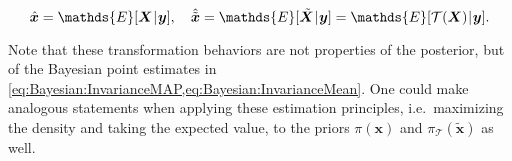 \begin{equation} \label{eq:Bayesian:InvarianceMean}
  \hat{\bm{x}} = \mathds{E}[\bm{X} \cond \bm{y}], \quad
  \hat{\tilde{\bm{x}}} = \mathds{E}[\tilde{\bm{X}} \cond \bm{y}] = \mathds{E}[\mathcal{T}(\bm{X}) \cond \bm{y}].
\end{equation}
\par %
Note that these transformation behaviors are not properties of the posterior, but of the Bayesian point estimates in \cref{eq:Bayesian:InvarianceMAP,eq:Bayesian:InvarianceMean}.
One could make analogous statements when applying these estimation principles, i.e.\ maximizing the density and taking the expected value,
to the priors \(\pi(\bm{x})\) and \(\pi_{\mathcal{T}}(\tilde{\bm{x}})\) as well.